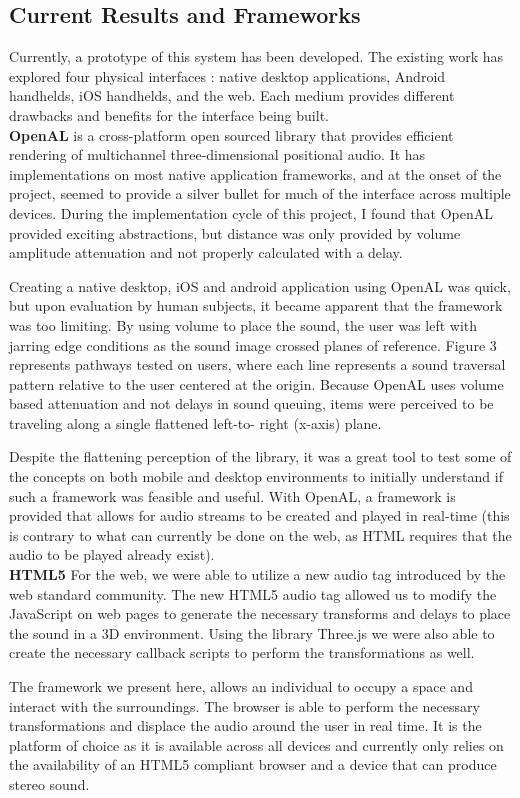 \subsection{                  Current Results and Frameworks                  }

Currently, a prototype of this system has been developed.  The existing work
has explored four physical interfaces : native desktop applications, Android
handhelds, iOS handhelds, and the web. Each medium provides different drawbacks
and benefits for the interface being built.\\

\textbf{OpenAL} is a cross-platform open sourced library that provides
efficient rendering of multichannel three-dimensional positional audio.  It has
implementations on most native  application frameworks, and at the onset of the
project, seemed to provide a silver bullet for much of the interface across
multiple devices.  During the implementation cycle of this project, I found
that OpenAL provided exciting abstractions, but distance was only provided by
volume amplitude attenuation and not properly calculated with a delay.

Creating a native desktop, iOS and android application using OpenAL was quick,
but upon evaluation by  human subjects, it became apparent that the framework
was too limiting.  By using volume to place the sound, the user was left with
jarring edge conditions as the sound image crossed planes of reference.
Figure 3 represents pathways tested on users, where each line
represents a sound traversal pattern relative to the user centered at the
origin. Because OpenAL uses volume based attenuation and not delays in sound
queuing, items were perceived to be traveling along a single flattened left-to-
right (x-axis) plane.

Despite the flattening perception of the library, it was a great tool to test
some of the concepts on both mobile and desktop environments to initially
understand if such a framework was feasible and useful.  With OpenAL, a
framework is provided that allows for audio streams to be created and played in
real-time (this is contrary to what can currently be done on the web, as HTML
requires that the audio to be played already exist).\\


\textbf{HTML5} For the web, we were able to utilize a new audio tag introduced
by the web standard community.  The new HTML5 audio tag allowed us to modify the
JavaScript on web pages to generate the necessary transforms and delays to
place the sound in a 3D environment.  Using the library Three.js we were also
able to create the necessary callback scripts to perform the transformations as
well.

The framework we present here, allows an individual to occupy a space and
interact with the surroundings.  The browser is able to perform the necessary
transformations and displace the audio around the user in real time. It is the
platform of choice as it is available across all devices and currently only
relies on the availability of an HTML5 compliant browser and a device that
can produce stereo sound.